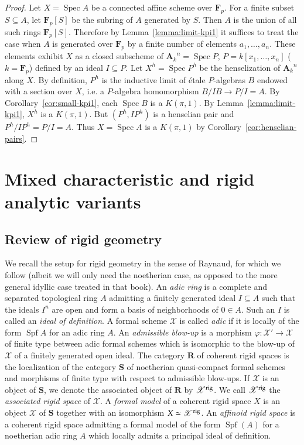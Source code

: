 \documentclass[twoside]{amsart}
\renewcommand{\AA}{\mathbf{A}}
\newcommand{\FF}{\mathbf{F}}
\newcommand{\RR}{\mathbf{R}}
\newcommand{\Xx}{\mathscr{X}}
\newcommand{\rig}{{\rm rig}}
\DeclareMathOperator{\Spec}{Spec}
\DeclareMathOperator{\Spf}{Spf}
\newcommand{\ANK}[2]{{\AA_{#2}}^{\! \! \! \!  #1}} %
\newcommand{\AN}[1]{\ANK{#1}{k}}
\newcommand{\isom}{\simeq}
\renewcommand{\phi}{\varphi}
\renewcommand{\to}{\longrightarrow}
\theoremstyle{plain}
\theoremstyle{definition}
\theoremstyle{remark}
\numberwithin{equation}{subsection}
\begin{document}
\begin{proof}
Let $X=\Spec A$ be a connected affine scheme over $\FF_p$. For a finite subset $S\subseteq A$, let $\FF_p[S]$ be the subring of $A$ generated by $S$. Then $A$ is the union of all such rings $\FF_p[S]$. Therefore by Lemma~\ref{lemma:limit-kpi1} it suffices to treat the case when $A$ is generated over $\FF_p$ by a finite number of elements $a_1, \ldots, a_n$. These elements exhibit $X$ as a closed subscheme of $\AN n=\Spec P$, $P=k[x_1, \ldots, x_n]$ ($k=\FF_p$) defined by an ideal $I\subseteq P$. Let $X^h=\Spec P^h$ be the henselization of $\AN n$ along $X$. By definition, $P^h$ is the inductive limit of \'etale $P$-algebras $B$ endowed with a section over $X$, i.e. a $P$-algebra homomorphism $B/IB\to P/I=A$. By Corollary~\ref{cor:small-kpi1}, each $\Spec B$ is a $K(\pi, 1)$. By Lemma~\ref{lemma:limit-kpi1}, $X^h$ is a $K(\pi, 1)$. But $(P^h, IP^h)$ is a henselian pair and $P^h/IP^h = P/I = A$. Thus $X=\Spec A$ is a $K(\pi, 1)$ by Corollary~\ref{cor:henselian-pairs}.
\end{proof}

\section{Mixed characteristic and rigid analytic variants}
\label{s:local-rigid}

\subsection{Review of rigid geometry}

We recall the setup for rigid geometry in the sense of Raynaud, for which we follow \cite{AbbesRigid} (albeit we will only need the noetherian case, as opposed to the more general idyllic case treated in that book). An \emph{adic ring} is a complete and separated topological ring $A$ admitting a finitely generated ideal $I\subseteq A$ such that the ideals $I^n$ are open and form a basis of neighborhoods of $0\in A$. Such an $I$ is called an \emph{ideal of definition}. A formal scheme $\Xx$ is called \emph{adic} if it is locally of the form $\Spf A$ for an adic ring $A$. An \emph{admissible blow-up} is a morphism $\phi\colon \Xx'\to\Xx$ of finite type between adic formal schemes which is isomorphic to the blow-up of $\Xx$ of a finitely generated open ideal. The category $\RR$ of coherent rigid spaces is the localization of the category $\mathbf{S}$ of noetherian quasi-compact formal schemes and morphisms of finite type with respect to admissible blow-ups. If $\Xx$ is an object of $\mathbf{S}$, we denote the associated object of $\RR$ by $\Xx^\rig$. We call $\Xx^\rig$ the \emph{associated rigid space} of $\Xx$. A \emph{formal model} of a coherent rigid space $X$ is an object $\Xx$ of $\mathbf{S}$ together with an isomorphism $X\isom \Xx^\rig$. An \emph{affinoid rigid space} is a coherent rigid space admitting a formal model of the form $\Spf(A)$ for a noetherian adic ring $A$ which locally admits a principal ideal of definition. 
\end{document}
